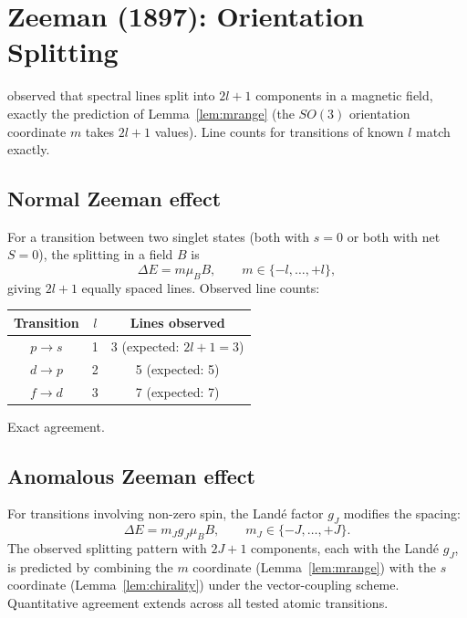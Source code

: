 \documentclass[11pt,twocolumn,a4paper]{article}
\theoremstyle{axiomstyle}
\theoremstyle{conseqstyle}
\theoremstyle{definition}
\theoremstyle{remark}
\begin{document}
\section{Zeeman (1897): Orientation Splitting}
\label{sec:zeeman}

\citet{zeeman1897} observed that spectral lines split into $2l+1$ components in a magnetic field, exactly the prediction of Lemma~\ref{lem:mrange} (the $SO(3)$ orientation coordinate $m$ takes $2l+1$ values). Line counts for transitions of known $l$ match exactly.

\subsection{Normal Zeeman effect}

For a transition between two singlet states (both with $s=0$ or both with net $S=0$), the splitting in a field $B$ is
\begin{equation*}
\Delta E = m \mu_{B} B,\qquad m\in\{-l,\ldots,+l\},
\end{equation*}
giving $2l+1$ equally spaced lines. Observed line counts:
\begin{center}
\begin{tabular}{c|c|c}
\toprule
Transition & $l$ & Lines observed\\
\midrule
$p\to s$ & 1 & 3 (expected: $2l+1=3$)\\
$d\to p$ & 2 & 5 (expected: 5)\\
$f\to d$ & 3 & 7 (expected: 7)\\
\bottomrule
\end{tabular}
\end{center}
Exact agreement.

\subsection{Anomalous Zeeman effect}

For transitions involving non-zero spin, the Land\'e factor $g_{J}$ modifies the spacing:
\begin{equation*}
\Delta E = m_{J} g_{J} \mu_{B} B,\qquad m_{J}\in\{-J,\ldots,+J\}.
\end{equation*}
The observed splitting pattern with $2J+1$ components, each with the Land\'e $g_{J}$, is predicted by combining the $m$ coordinate (Lemma~\ref{lem:mrange}) with the $s$ coordinate (Lemma~\ref{lem:chirality}) under the vector-coupling scheme. Quantitative agreement extends across all tested atomic transitions.
\end{document}
